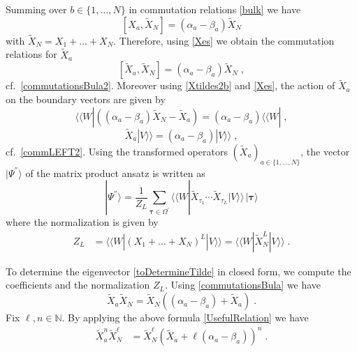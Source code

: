 \documentclass[10pt]{article}
\numberwithin{equation}{section}
\numberwithin{equation}{subsection}
\newcommand{\Xt}{\widetilde{X}}
\newcommand{\co}{\;,}
\newcommand{\dt}{\;.}
\begin{document}
Summing over $b\in \{1,\ldots,N\}$ in commutation relations \eqref{bulk} we have
\begin{equation} 
	\left[X_{a},\Xt_{N}\right]=(\alpha_{a}-\beta_{a})\Xt_{N}
\end{equation}
with $\widetilde{X}_{N}= {X}_{1}+\ldots+ {X}_{N}$. 
Therefore, using \eqref{Xes}
we obtain the commutation relations for $\Xt_{a}$ 
\begin{equation}\label{commutationsBula}
	\left[\Xt_{a},\Xt_{N}\right]=(\alpha_{a}-\beta_{a})\Xt_{N}\co
\end{equation} 
cf.~\eqref{commutationsBula2}.
Moreover using \eqref{Xtildes2b} and \eqref{Xes}, the action of $\Xt_{a}$ on the boundary vectors are given by 
\begin{equation}\label{commLEFT}
	 \langle \langle W|  \left((\alpha_{a}-\beta_{a})\Xt_{N}-\Xt_{a}\right)=(\alpha_{a}-\beta_{a}) \langle \langle W|  
	\co
\end{equation}
\begin{equation}\label{commRIGHT}
	\Xt_{a}  |V\rangle\rangle = (\alpha_{a}-\beta_{a}) |V\rangle\rangle 
	\co
\end{equation}  
cf.~\eqref{commLEFT2}.
Using the transformed operators $(\widetilde{X}_{a})_{a\in\{1,\ldots,N\}}$, the vector $|\Psi^{''}\rangle$ of the matrix product ansatz is written as
\begin{equation}\label{toDetermineTilde}
	|\Psi^{''}\rangle = \frac{1}{Z_{L}}\sum_{\bm{\tau}\in \Omega^{'}} \langle \langle W| \widetilde{X}_{\tau_{1}}\cdots \widetilde{X}_{\tau_{L}}
	|V\rangle\rangle \,|\bm{\tau}\rangle
\end{equation} 
where
the normalization is given by 
\begin{align}
		Z_{L}&= \langle \langle W|  (X_{1}+\ldots+X_{N})^{L} |V\rangle\rangle = \langle \langle W|  \widetilde{X}_{N}^{L} |V\rangle\rangle \dt
\end{align}

To determine the eigenvector \eqref{toDetermineTilde} in closed form, we compute the coefficients and the normalization $Z_{L}$. Using \eqref{commutationsBula} we have
\begin{equation}\label{UsefulRelation}
	\widetilde{X}_{a}\widetilde{X}_{N}=\widetilde{X}_{N}\left((\alpha_{a}-\beta_{a})+\widetilde{X}_{a}\right)\dt
\end{equation}
Fix  $ \ell,n\in \mathbb{N}$. By applying the above formula \eqref{UsefulRelation} we have
\begin{align}\label{usefulRelaton-many}
	\widetilde{X}_{a}^{n}\widetilde{X}_{N}^{\ell}&=
	\widetilde{X}_{N}^{\ell}\left(\widetilde{X}_{a}+\ell(\alpha_{a}-\beta_{a})\right)^{n}\dt
\end{align}
\end{document}
